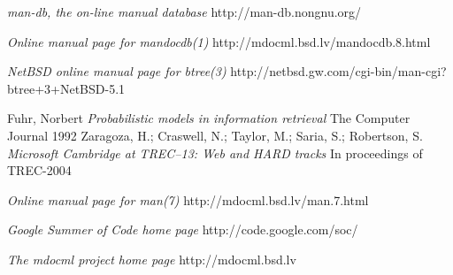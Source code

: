 \documentclass[titlepage, a4paper, 12pt]{article}
\begin{document}
\begin{thebibliography}{20}
\emph{man-db, the on-line manual database}
\newline http://man-db.nongnu.org/

\emph{Online manual page for mandocdb(1)}
\newline http://mdocml.bsd.lv/mandocdb.8.html

\emph{NetBSD online manual page for btree(3)}
\newline http://netbsd.gw.com/cgi-bin/man-cgi?btree+3+NetBSD-5.1

Fuhr, Norbert
\emph{Probabilistic models in information
retrieval}
The Computer Journal
1992
Zaragoza, H.; Craswell, N.; Taylor, M.;
Saria, S.; Robertson, S.
\emph{Microsoft Cambridge at TREC–13: Web
and HARD tracks}
In proceedings of TREC-2004

\emph{Online manual page for man(7)}
\newline http://mdocml.bsd.lv/man.7.html

\emph{Google Summer of Code home page}
\newline http://code.google.com/soc/

\emph {The mdocml project home page}
\newline http://mdocml.bsd.lv
\end{thebibliography}
\end{document}
